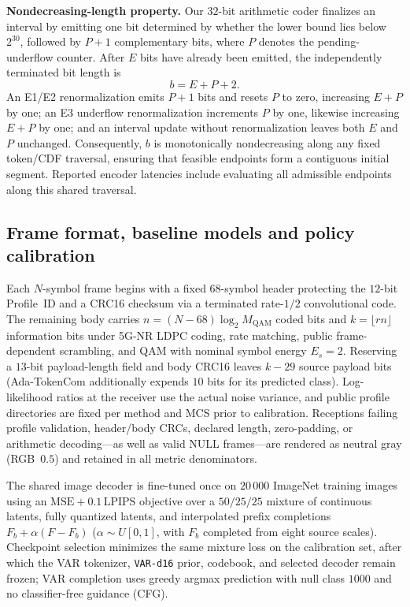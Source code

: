 \documentclass[10pt,letterpaper]{article}
\begin{document}
\textbf{Nondecreasing-length property.} Our $32$-bit arithmetic coder finalizes an interval by emitting one bit determined by whether the lower bound lies below $2^{30}$, followed by $P+1$ complementary bits, where $P$ denotes the pending-underflow counter. After $E$ bits have already been emitted, the independently terminated bit length is
\begin{equation}
b = E + P + 2. \label{eq:s3}
\end{equation}
An E1/E2 renormalization emits $P+1$ bits and resets $P$ to zero, increasing $E+P$ by one; an E3 underflow renormalization increments $P$ by one, likewise increasing $E+P$ by one; and an interval update without renormalization leaves both $E$ and $P$ unchanged. Consequently, $b$ is monotonically nondecreasing along any fixed token/CDF traversal, ensuring that feasible endpoints form a contiguous initial segment. Reported encoder latencies include evaluating all admissible endpoints along this shared traversal.

\subsection{Frame format, baseline models and policy calibration}
Each $N$-symbol frame begins with a fixed $68$-symbol header protecting the $12$-bit Profile~ID and a CRC16 checksum via a terminated rate-$1/2$ convolutional code. The remaining body carries $n=(N-68)\log_2 M_{\mathrm{QAM}}$ coded bits and $k=\lfloor rn\rfloor$ information bits under 5G-NR LDPC coding, rate matching, public frame-dependent scrambling, and QAM with nominal symbol energy $E_s=2$. Reserving a $13$-bit payload-length field and body CRC16 leaves $k-29$ source payload bits (Ada-TokenCom additionally expends $10$ bits for its predicted class). Log-likelihood ratios at the receiver use the actual noise variance, and public profile directories are fixed per method and MCS prior to calibration. Receptions failing profile validation, header/body CRCs, declared length, zero-padding, or arithmetic decoding---as well as valid NULL frames---are rendered as neutral gray (RGB~$0.5$) and retained in all metric denominators.

The shared image decoder is fine-tuned once on $20\,000$ ImageNet training images using an $\mathrm{MSE}+0.1\,\mathrm{LPIPS}$ objective over a $50/25/25$ mixture of continuous latents, fully quantized latents, and interpolated prefix completions $F_b+\alpha(F-F_b)$ ($\alpha\sim U[0,1]$, with $F_b$ completed from eight source scales). Checkpoint selection minimizes the same mixture loss on the calibration set, after which the VAR tokenizer, \texttt{VAR-d16} prior, codebook, and selected decoder remain frozen; VAR completion uses greedy argmax prediction with null class $1000$ and no classifier-free guidance (CFG).
\end{document}
